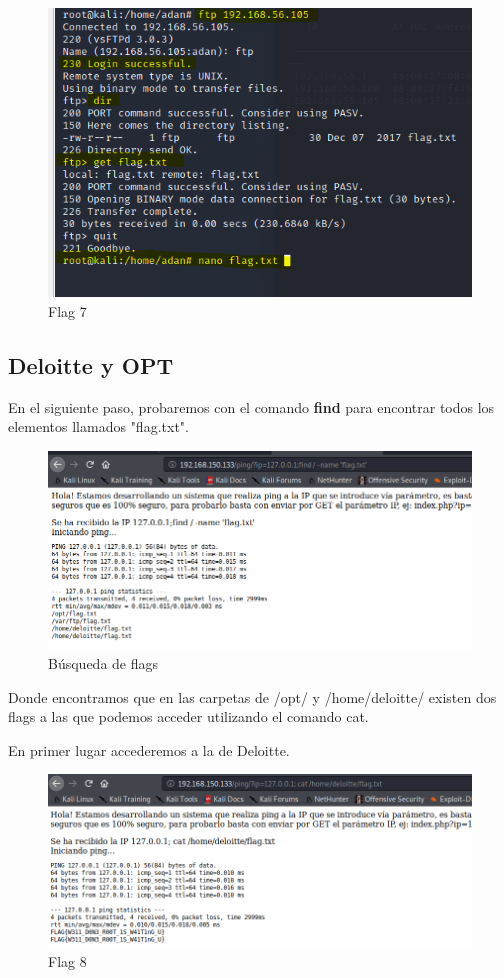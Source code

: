\documentclass[12pt,twoside]{article}
\begin{document}
\begin{figure}[h]
    \centering
    \includegraphics[scale=0.5]{./imagenes/ftp_flag}
    \caption{Flag 7}
\end{figure}
\subsection{Deloitte y OPT}
En el siguiente paso, probaremos con el comando \textbf{find} para encontrar todos los elementos llamados "flag.txt".

\begin{figure}[h]
    \centering
    \includegraphics[scale=0.5]{./imagenes/ping_busqueda_flag}
    \caption{Búsqueda de flags}
\end{figure}

Donde encontramos que en las carpetas de /opt/ y /home/deloitte/ existen dos flags a las que podemos acceder utilizando el comando cat. 

En primer lugar accederemos a la de Deloitte.
\begin{figure}[h]
    \centering
    \includegraphics[scale=0.5]{./imagenes/cat_flag_deloitte}
    \caption{Flag 8}
\end{figure}
\end{document}
